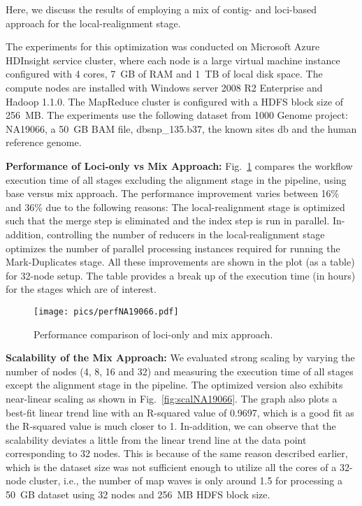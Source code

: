 Here, we discuss the results of employing a mix of contig- and loci-based approach for the local-realignment stage.

The experiments for this optimization was conducted on Microsoft Azure HDInsight service cluster, where each node is a large virtual machine instance configured with 4 cores, 7~GB of RAM and 1~TB of local disk space. The compute nodes are installed with Windows server 2008 R2 Enterprise and Hadoop 1.1.0. The MapReduce cluster is configured with a HDFS block size of 256~MB. The experiments use the following dataset from 1000 Genome project: NA19066, a 50~GB BAM file, dbsnp\_135.b37, the known sites db and the human reference genome.

\noindent \textbf{Performance of Loci-only vs Mix Approach:}
Fig.~\ref{fig:perfNA19066} compares the workflow execution time of all stages excluding the alignment stage in the pipeline, using base versus mix approach. The performance improvement varies between 16\% and 36\% due to the following reasons: The local-realignment stage is optimized such that the merge step is eliminated and the index step is run in parallel. In-addition, controlling the number of reducers in the local-realignment stage optimizes the number of parallel processing instances required for running the Mark-Duplicates stage. All these improvements are shown in the plot (as a table) for 32-node setup. The table provides a break up of the execution time (in hours) for the stages which are of interest.

\begin{figure}[!h]
  \centering
  \texttt{[image: pics/perfNA19066.pdf]}
  \caption{Performance comparison of loci-only and mix approach.}
  \label{fig:perfNA19066}
\end{figure}

\noindent \textbf{Scalability of the Mix Approach:} We evaluated strong scaling by varying the number of nodes (4, 8, 16 and 32) and measuring the execution time of all stages except the alignment stage in the pipeline. The optimized version also exhibits near-linear scaling as shown in Fig.~\ref{fig:scalNA19066}. The graph also plots a best-fit linear trend line with an R-squared value of 0.9697, which is a good fit as the R-squared value is much closer to 1. In-addition, we can observe that the scalability deviates a little from the linear trend line at the data point corresponding to 32 nodes. This is because of the same reason described earlier, which is the dataset size was not sufficient enough to utilize all the cores of a 32-node cluster, i.e., the number of map waves is only around 1.5 for processing a 50~GB dataset using 32 nodes and 256~MB HDFS block size.

